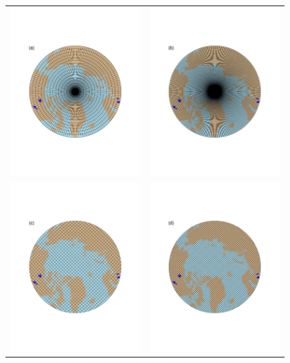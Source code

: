 \documentclass[draft]{agujournal2019}
\begin{document}
\begin{figure}[t]
\begin{center}
\begin{tabular}{cc}
         \includegraphics[width=50mm]{figs/grid-f19.pdf}&
         \includegraphics[width=50mm]{figs/grid-f09.pdf}\\
         \includegraphics[width=50mm]{figs/grid-ne30pg2.pdf}&
         \includegraphics[width=50mm]{figs/grid-ne30pg3.pdf} \\

\end{tabular}
\end{center}
\end{figure}
\end{document}
